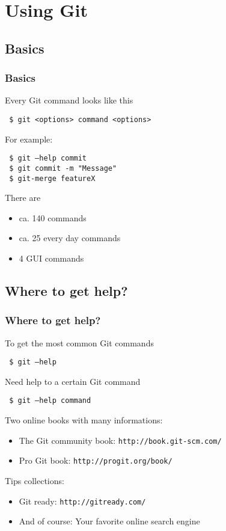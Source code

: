 \documentclass{beamer}
\begin{document}
\section{Using Git}
\subsection{Basics}
\begin{frame}
  \frametitle{Basics}
  Every Git command looks like this\medskip
  
  {\tt\ \$ git <options> command <options>}\medskip
  
  \pause
  For example:\medskip
  
  {\tt\ \$ git --help commit}\\
  {\tt\ \$ git commit -m "Message"}\\
  {\tt\ \$ git-merge featureX}\medskip
  
  \pause
  There are
  \begin{itemize}
    \item ca. 140 commands
    \item ca. 25 every day commands
    \item 4 GUI commands
  \end{itemize}   
\end{frame}

\subsection{Where to get help?}
\begin{frame}
    \frametitle{Where to get help?}
    To get the most common Git commands\medskip
    
    {\tt\ \$ git --help}\medskip
   
    \pause
    Need help to a certain Git command\medskip
    
    {\tt\ \$ git --help command}\medskip
    
    \pause
    Two online books with many informations:
    \begin{itemize}
      \item The Git community book: \texttt{http://book.git-scm.com/}
      \item Pro Git book: \texttt{http://progit.org/book/}
    \end{itemize}
    \pause
    Tips collections:
    \begin{itemize}
      \item Git ready: \texttt{http://gitready.com/}
      \item And of course: Your favorite online search engine
    \end{itemize}
\end{frame}
\end{document}
